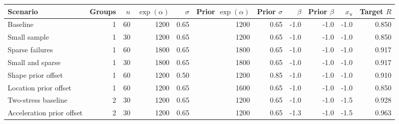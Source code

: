 \begin{tabular}{lrrrrrrrrrr}
\toprule
Scenario & Groups & $n$ & $\exp(\alpha)$ & $\sigma$ & Prior $\exp(\alpha)$ & Prior $\sigma$ & $\beta$ & Prior $\beta$ & $x_u$ & Target $R$ \\
\midrule
Baseline & 1 & 60 & 1200 & 0.65 & 1200 & 0.65 & -1.0 & -1.0 & -1.0 & 0.850 \\
Small sample & 1 & 30 & 1200 & 0.65 & 1200 & 0.65 & -1.0 & -1.0 & -1.0 & 0.850 \\
Sparse failures & 1 & 60 & 1800 & 0.65 & 1800 & 0.65 & -1.0 & -1.0 & -1.0 & 0.917 \\
Small and sparse & 1 & 30 & 1800 & 0.65 & 1800 & 0.65 & -1.0 & -1.0 & -1.0 & 0.917 \\
Shape prior offset & 1 & 60 & 1200 & 0.50 & 1200 & 0.85 & -1.0 & -1.0 & -1.0 & 0.910 \\
Location prior offset & 1 & 60 & 1200 & 0.65 & 1600 & 0.65 & -1.0 & -1.0 & -1.0 & 0.850 \\
Two-stress baseline & 2 & 30 & 1200 & 0.65 & 1200 & 0.65 & -1.0 & -1.0 & -1.5 & 0.928 \\
Acceleration prior offset & 2 & 30 & 1200 & 0.65 & 1200 & 0.65 & -1.3 & -1.0 & -1.5 & 0.963 \\
\bottomrule
\end{tabular}
